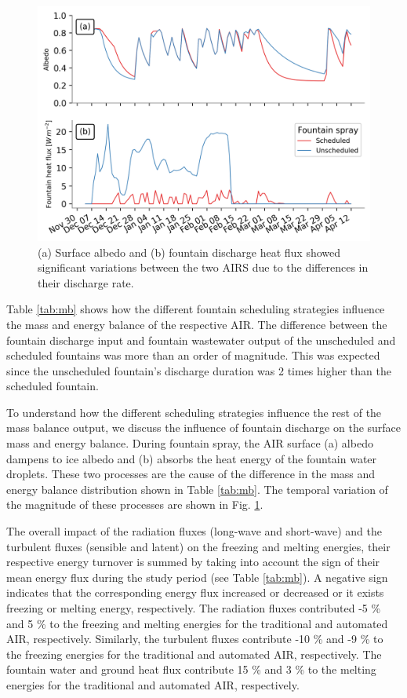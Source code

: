 \documentclass[tc, manuscript]{copernicus}
\begin{document}
\begin{figure}[t]
\includegraphics[width=12cm]{Figures/dis_processes.png}
\caption{(a) Surface albedo  and (b) fountain discharge heat flux showed significant variations between the two
  AIRS due to the differences in their discharge rate.}
\label{fig:dis_processes}
\end{figure}

Table \ref{tab:mb} shows how the different fountain scheduling strategies influence the mass and energy balance
of the respective AIR. The difference between the fountain discharge input and fountain wastewater output of the
unscheduled and scheduled fountains was more than an order of magnitude. This was expected since the unscheduled
fountain's discharge duration was 2 times higher than the scheduled fountain.

To understand how the different scheduling strategies influence the rest of the mass balance output, we discuss
the influence of fountain discharge on the surface mass and energy balance. During fountain spray, the AIR
surface (a) albedo dampens to ice albedo and (b) absorbs the heat energy of the fountain water droplets. These
two processes are the cause of the difference in the mass and energy balance distribution shown in Table
\ref{tab:mb}. The temporal variation of the magnitude of these processes are shown in Fig.
\ref{fig:dis_processes}. 

The overall impact of the radiation fluxes (long-wave and short-wave) and the turbulent fluxes (sensible and
latent) on the freezing and melting energies, their respective energy turnover is summed by taking into account
the sign of their mean energy flux during the study period (see Table \ref{tab:mb}). A negative sign indicates
that the corresponding energy flux increased or decreased or it exists freezing or melting energy, respectively.
The radiation fluxes contributed -5 \% and 5 \% to the freezing and melting energies for the traditional and
automated AIR, respectively.  Similarly, the turbulent fluxes contribute -10 \% and -9 \% to the freezing
energies for the traditional and automated AIR, respectively. The fountain water and ground heat flux contribute
15 \% and 3 \% to the melting energies for the traditional and automated AIR, respectively. 
\end{document}
